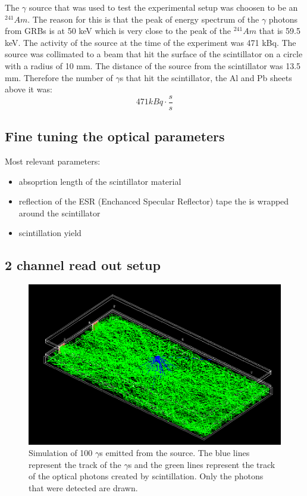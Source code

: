 \documentclass[12pt, a4paper,titlepage]{article}
\numberwithin{equation}{section}
\numberwithin{figure}{section}
\begin{document}
The $\gamma$ source that was used to test the experimental setup was choosen to be an $^{241}Am$. The reason for this is that the peak of energy spectrum of the $\gamma$ photons from GRBs is at 50 keV which is very close to the peak of the $^{241}Am$ that is 59.5 keV. The activity of the source at the time of the experiment was 471 kBq. The source was collimated to a beam that hit the surface of the scintillator on a circle with a radius of 10 mm. The distance of the source from the scintillator was 13.5 mm. Therefore the number of $\gamma$s that hit the scintillator, the Al and Pb sheets above it was:
$$471 kBq \cdot \frac{s}{s}$$



\subsection{Fine tuning the optical parameters}

Most relevant parameters:
\begin{itemize}
\item absoprtion length of the scintillator material
\item reflection of the ESR (Enchanced Specular Reflector) tape the is wrapped around the scintillator 
\item scintillation yield
\end{itemize}



\subsection{2 channel read out setup}

\begin{figure}[H]
\includegraphics[width=160.0mm]{images/2channel.png}
\caption{Simulation of 100 $\gamma$s emitted from the source. The blue lines represent the track of the $\gamma$s and the green lines represent the track of the optical photons created by scintillation. Only the photons that were detected are drawn.}
\end{figure}
\end{document}
